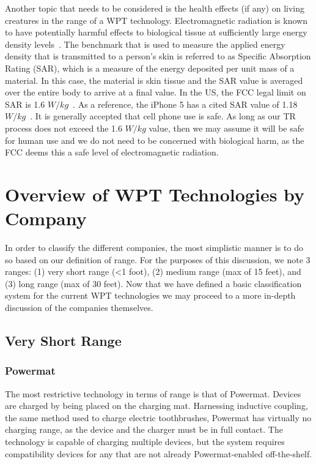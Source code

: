 Another topic that needs to be considered is the health effects (if any) on living creatures in the range of a WPT technology. Electromagnetic radiation is known to have potentially harmful effects to biological tissue at sufficiently large energy density levels~\cite{adey1993biological}. The benchmark that is used to measure the applied energy density that is transmitted to a person's skin is referred to as Specific Absorption Rating (SAR), which is a measure of the energy deposited per unit mass of a material. In this case, the material is skin tissue and the SAR value is averaged over the entire body to arrive at a final value. In the US, the FCC legal limit on SAR is 1.6 $W/kg$~\cite{procon2015}. As a reference, the iPhone 5 has a cited SAR value of 1.18 $W/kg$~\cite{procon2015}. It is generally accepted that cell phone use is safe. As long as our TR process does not exceed the 1.6 $W/kg$ value, then we may assume it will be safe for human use and we do not need to be concerned with biological harm, as the FCC deems this a safe level of electromagnetic radiation.

\section{Overview of WPT Technologies by Company}
\label{sec:lit-review-tech}
In order to classify the different companies, the most simplistic manner is to do so based on our definition of range. For the purposes of this discussion, we note 3 ranges: (1) very short range (<1 foot), (2) medium range (max of 15 feet), and (3) long range (max of 30 feet). Now that we have defined a basic classification system for the current WPT technologies we may proceed to a more in-depth discussion of the companies themselves.

\subsection{Very Short Range}
\subsubsection{Powermat}
The most restrictive technology in terms of range is that of Powermat. Devices are charged by being placed on the charging mat. Harnessing inductive coupling, the same method used to charge electric toothbrushes, Powermat has virtually no charging range, as the device and the charger must be in full contact. The technology is capable of charging multiple devices, but the system requires compatibility devices for any that are not already Powermat-enabled off-the-shelf.

